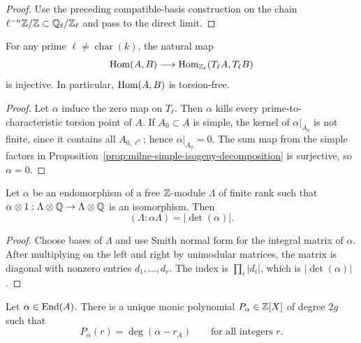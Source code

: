 \begin{proof}
Use the preceding compatible-basis construction on the chain
$\ell^{-n}\mathbb{Z}/\mathbb{Z}\subset\mathbb{Q}_\ell/\mathbb{Z}_\ell$ and pass to the direct limit.
\end{proof}

\begin{lemma}
\label{lem:milne-tate-injective}

For any prime $\ell\ne\operatorname{char}(k)$, the natural map
\[
\operatorname{Hom}(A,B)\longrightarrow\operatorname{Hom}_{\mathbb{Z}_\ell}(T_\ell A,T_\ell B)
\]
is injective.  In particular, $\operatorname{Hom}(A,B)$ is torsion-free.
\end{lemma}

\begin{proof}
Let $\alpha$ induce the zero map on $T_\ell$.  Then $\alpha$ kills every
prime-to-characteristic torsion point of $A$.  If $A_0\subset A$ is simple,
the kernel of $\alpha|_{A_0}$ is not finite, since it contains all
$A_{0,\ell^n}$; hence $\alpha|_{A_0}=0$.  The sum map from the simple factors
in Proposition~\ref{prop:milne-simple-isogeny-decomposition} is surjective,
so $\alpha=0$.
\end{proof}

\begin{lemma}
\label{lem:milne-index-determinant}

\leanok
Let $\alpha$ be an endomorphism of a free $\mathbb{Z}$-module $\Lambda$ of finite
rank such that $\alpha\otimes1:\Lambda\otimes\mathbb{Q}\to\Lambda\otimes\mathbb{Q}$ is an
isomorphism.  Then
\[
(\Lambda:\alpha\Lambda)=|\det(\alpha)|.
\]
\end{lemma}

\begin{proof}
\leanok
Choose bases of $\Lambda$ and use Smith normal form for the integral matrix
of $\alpha$.  After multiplying on the left and right by unimodular matrices,
the matrix is diagonal with nonzero entries $d_1,\ldots,d_r$.  The index is
$\prod_i|d_i|$, which is $|\det(\alpha)|$.
\end{proof}

\begin{theorem}
\label{thm:milne-endomorphism-characteristic-polynomial}

Let $\alpha\in\operatorname{End}(A)$.  There is a unique monic polynomial
$P_\alpha\in\mathbb{Z}[X]$ of degree $2g$ such that
\[
P_\alpha(r)=\deg(\alpha-r_A)
\qquad\text{for all integers }r.
\]
\end{theorem}

